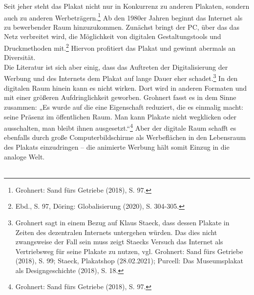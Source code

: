 \documentclass[a4paper,12pt,ngerman]{article}
\begin{document}
Seit jeher steht das Plakat nicht nur in Konkurrenz zu anderen Plakaten, sondern auch zu anderen Werbeträgern.\footnote{Grohnert: Sand fürs Getriebe (2018), S. 97.}  Ab den 1980er Jahren beginnt das Internet als zu bewerbender Raum hinzuzukommen. Zunächst bringt der PC, über das das Netz verbreitet wird, die Möglichkeit von digitalen Gestaltungstools und Druckmethoden mit.\footnote{Ebd., S. 97, Döring: Globalisierung (2020), S. 304-305.}  Hiervon profitiert das Plakat und gewinnt abermals an Diversität. \\
Die Literatur ist sich aber einig, dass das Auftreten der Digitalisierung der Werbung und des Internets dem Plakat auf lange Dauer eher schadet.\footnote{Grohnert sagt in einem Bezug auf Klaus Staeck, dass dessen Plakate in Zeiten des dezentralen Internets untergehen würden. Das dies nicht zwangsweise der Fall sein muss zeigt Staecks Versuch das Internet als Vertriebsweg für seine Plakate zu nutzen, vgl. Grohnert: Sand fürs Getriebe (2018), S. 99; Staeck, Plakatshop (28.02.2021); Purcell: Das Museumsplakat als Designgeschichte (2018), S. 18.}  In den digitalen Raum hinein kann es nicht wirken. Dort wird in anderen Formaten und mit einer größeren Aufdringlichkeit geworben. Grohnert fasst es in dem Sinne zusammen: „Es wurde auf die eine Eigenschaft reduziert, die es einmalig macht: seine Präsenz im öffentlichen Raum. Man kann Plakate nicht wegklicken oder ausschalten, man bleibt ihnen ausgesetzt.“\footnote{Grohnert: Sand fürs Getriebe (2018), S. 97.}  Aber der digitale Raum schafft es ebenfalls durch große Computerbildschirme als Werbeflächen in den Lebensraum des Plakats einzudringen -- die animierte Werbung hält somit Einzug in die analoge Welt. \\
\\
\end{document}
